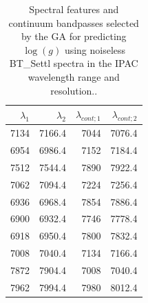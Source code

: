 \begin{table}
\begin{center}
\begin{tabular}{rrrr}
  \hline
  $\lambda_1$ & $\lambda_2$ & $\lambda_{cont;1}$ & $\lambda_{cont;2} $ \\ 
  \hline

7134 & 7166.4 &	7044 & 7076.4 \\
6954 & 6986.4 &	7152 & 7184.4 \\
7512 & 7544.4 &	7890 & 7922.4 \\
7062 & 7094.4 &	7224 & 7256.4 \\
6936 & 6968.4 &	7854 & 7886.4 \\
6900 & 6932.4 &	7746 & 7778.4 \\
6918 & 6950.4 &	7800 & 7832.4 \\
7008 & 7040.4 &	7134 & 7166.4 \\
7872 & 7904.4 &	7008 & 7040.4 \\
7962 & 7994.4 &	7980 & 8012.4 \\

\hline
\end{tabular}
\caption {Spectral features and continuum bandpasses selected by the
  GA for predicting $\log(g)$ using noiseless BT\_Settl spectra in the
  IPAC wavelength range and resolution..} \label{tab:ipac-logg-noiseless}
\end{center}
\end{table}


